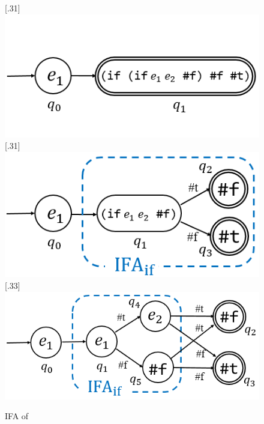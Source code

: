 \begin{example}

    \begin{figure}[t]
        \centering
        [.31\linewidth]{
            \includegraphics[scale=0.25]{images/ifa/ifa-nand-1-small.png}
        }
        [.31\linewidth]{
            \includegraphics[scale=0.25]{images/ifa/ifa-nand-2-small.png}
        }
        [.33\linewidth]{
            \includegraphics[scale=0.25]{images/ifa/ifa-nand-3-small.png}
        }
        \caption{IFA of }
        \label{fig:ifa-nand}
    \end{figure}


\end{example}
